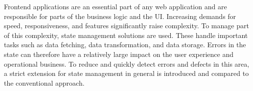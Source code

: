 Frontend applications are an essential part of any web application and are responsible for parts of the business logic and the UI. Increasing demands for speed, responsiveness, and features significantly raise complexity. To manage part of this complexity, state management solutions are used. These handle important tasks such as data fetching, data transformation, and data storage. Errors in the state can therefore have a relatively large impact on the user experience and operational business. To reduce and quickly detect errors and defects in this area, a strict extension for state management in general is introduced and compared to the conventional approach.